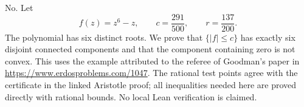 No. Let
\[
 f(z)=z^6-z,\qquad c=\frac{291}{500},\qquad r=\frac{137}{200}.
\tag{1}
\]
The polynomial has six distinct roots. We prove that $\{|f|\le c\}$ has exactly six disjoint connected components and that the component containing zero is not convex. This uses the example attributed to the referee of Goodman's paper in \url{https://www.erdosproblems.com/1047}. The rational test points agree with the certificate in the linked Aristotle proof; all inequalities needed here are proved directly with rational bounds. No local Lean verification is claimed.
